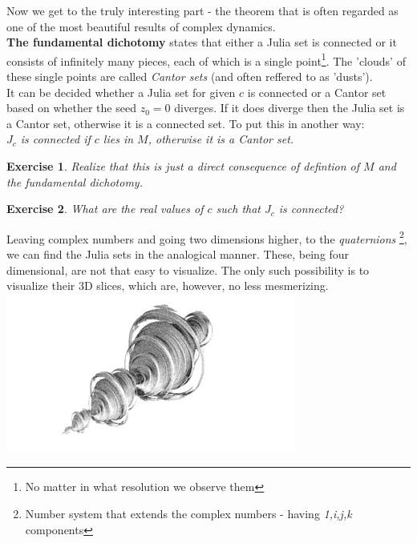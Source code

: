 \documentclass[12pt]{article}
\newtheorem{exercise}{Exercise}
\begin{document}
\noindent Now we get to the truly interesting part - the theorem that is often regarded as one of the most beautiful results of complex dynamics. \\
\textbf{The fundamental dichotomy} states that either a Julia set is connected or it consists of infinitely many pieces, each of which is a single point\footnote{No matter in what resolution we observe them}. The 'clouds' of these single points are called \emph{Cantor sets} (and often reffered to as 'dusts'). \\
It can be decided whether a Julia set for given $c$ is connected or a Cantor set based on whether the seed $z_0 = 0$ diverges. If it does diverge then the Julia set is a Cantor set, otherwise it is a connected set. To put this in another way:\\ \emph{$J_c$ is connected if $c$ lies in $M$, otherwise it is a Cantor set.}
\begin{exercise}
Realize that this is just a direct consequence of defintion of $M$ and the fundamental dichotomy.
\end{exercise} 
\begin{exercise}
What are the real values of $c$ such that $J_c$ is connected?
\end{exercise} 

\noindent Leaving complex numbers and going two dimensions higher, to the \emph{quaternions} \footnote{Number system that extends the complex numbers - having \emph{1,i,j,k} components}, we can find the Julia sets in the analogical manner. These, being four dimensional, are not that easy to visualize. The only such possibility is to visualize their 3D slices, which are, however, no less mesmerizing.\\
\includegraphics{quatjulia} 
\end{document}
